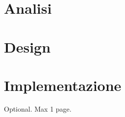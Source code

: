 \documentclass[12pt,a4paper,openright,twoside]{book}
\begin{document}
\chapter{Analisi}
\label{chap:analisi}

\chapter{Design}
\label{chap:design}

\chapter{Implementazione}
\label{chap:implementazione}


\backmatter

\nocite{*} %




\begin{acknowledgements} %
    Optional. Max 1 page.
\end{acknowledgements}
\end{document}
